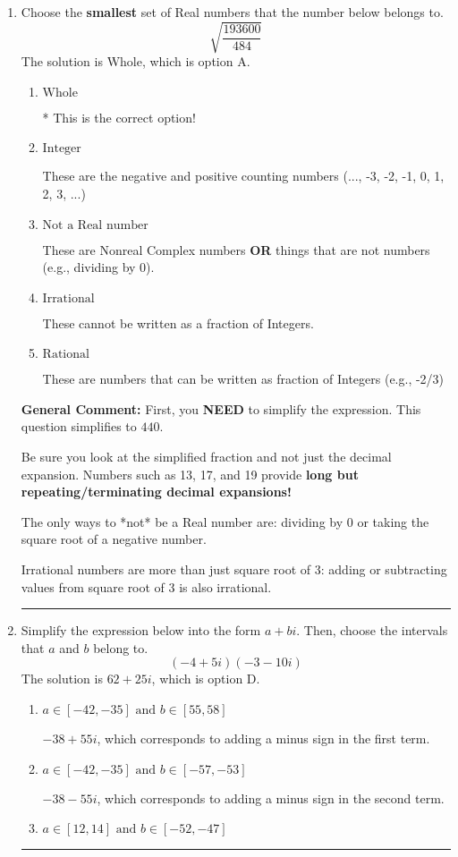 \documentclass{extbook}[14pt]
\newcommand{\litem}[1]{\item #1

\rule{\textwidth}{0.4pt}}
\begin{document}
\begin{enumerate}\litem{
Choose the \textbf{smallest} set of Real numbers that the number below belongs to.
\[ \sqrt{\frac{193600}{484}} \]The solution is \( \text{Whole} \), which is option A.\begin{enumerate}[label=\Alph*.]
\item \( \text{Whole} \)

* This is the correct option!
\item \( \text{Integer} \)

These are the negative and positive counting numbers (..., -3, -2, -1, 0, 1, 2, 3, ...)
\item \( \text{Not a Real number} \)

These are Nonreal Complex numbers \textbf{OR} things that are not numbers (e.g., dividing by 0).
\item \( \text{Irrational} \)

These cannot be written as a fraction of Integers.
\item \( \text{Rational} \)

These are numbers that can be written as fraction of Integers (e.g., -2/3)
\end{enumerate}

\textbf{General Comment:} First, you \textbf{NEED} to simplify the expression. This question simplifies to $440$. 
 
 Be sure you look at the simplified fraction and not just the decimal expansion. Numbers such as 13, 17, and 19 provide \textbf{long but repeating/terminating decimal expansions!} 
 
 The only ways to *not* be a Real number are: dividing by 0 or taking the square root of a negative number. 
 
 Irrational numbers are more than just square root of 3: adding or subtracting values from square root of 3 is also irrational.
}
\litem{
Simplify the expression below into the form $a+bi$. Then, choose the intervals that $a$ and $b$ belong to.
\[ (-4 + 5 i)(-3 - 10 i) \]The solution is \( 62 + 25 i \), which is option D.\begin{enumerate}[label=\Alph*.]
\item \( a \in [-42, -35] \text{ and } b \in [55, 58] \)

 $-38 + 55 i$, which corresponds to adding a minus sign in the first term.
\item \( a \in [-42, -35] \text{ and } b \in [-57, -53] \)

 $-38 - 55 i$, which corresponds to adding a minus sign in the second term.
\item \( a \in [12, 14] \text{ and } b \in [-52, -47] \)


\end{enumerate}}
\end{enumerate}
\end{document}

